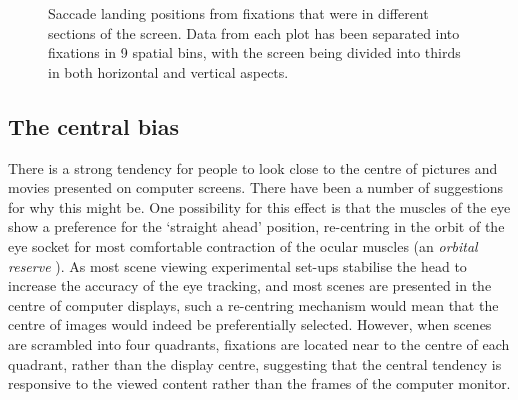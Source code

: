 \documentclass[a4paper, twocolumn, oneside, 10pt]{article}
\begin{document}
\begin{figure}[htb]
\caption{Saccade landing positions from fixations that were in different sections of the screen. Data from each plot has been separated into fixations in 9 spatial bins, with the screen being divided into thirds in both horizontal and vertical aspects.}
\label{fig:empiricalSaccadicFlow}
\end{figure}

\subsection{The central bias}

There is a strong tendency for people to look close to the centre of pictures \citep{tatler2007,tatler2005, Canosa:2003tu, clarke_tatler2014} and movies \citep{tseng2009} presented on computer screens. There have been a number of suggestions for why this might be. One possibility for this effect is that the muscles of the eye show a preference for the `straight ahead' position, re-centring in the orbit of the eye socket for most comfortable contraction of the ocular muscles (an \emph{orbital reserve} \citep{fuller1996}). As most scene viewing experimental set-ups stabilise the head to increase the accuracy of the eye tracking, and most scenes are presented in the centre of computer displays, such a re-centring mechanism would mean that the centre of images would indeed be preferentially selected. However, when scenes are scrambled into four quadrants, fixations are located near to the centre of each quadrant, rather than the display centre, suggesting that the central tendency is responsive to the viewed content \citep{stainer2013} rather than the frames of the computer monitor.
\end{document}
